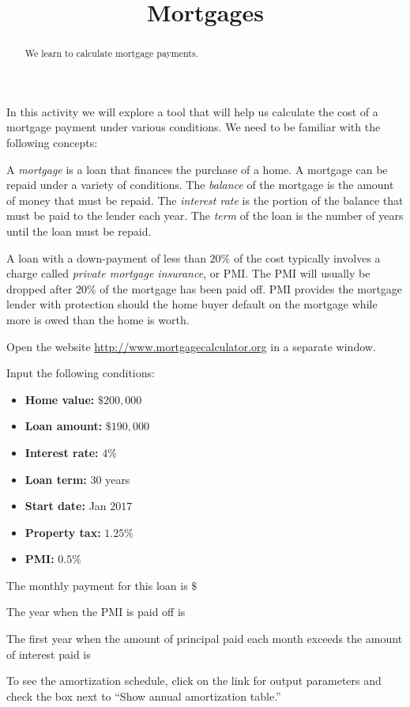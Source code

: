 \documentclass{ximera}
\title{Mortgages}
\begin{document}
\begin{abstract}
We learn to calculate mortgage payments.
\end{abstract}
\maketitle

In this activity we will explore a tool that will help us calculate the cost of a mortgage payment under various conditions. We need to be familiar with the following concepts:  

A \emph{mortgage} is a loan that finances the purchase of a home. A mortgage can be repaid under a variety of conditions. The \emph{balance} of the mortgage is the amount of money that must be repaid. The \emph{interest rate} is the portion of the balance that must be paid to the lender each year. The \emph{term} of the loan is the number of years until the loan must be repaid.

A loan with a down-payment of less than $20\%$ of the cost typically involves a charge called \emph{private mortgage insurance}, or PMI. The PMI will usually be dropped after $20\%$ of the mortgage has been paid off. PMI provides the mortgage lender with protection should the home buyer default on the mortgage while more is owed than the home is worth.

Open the website \href{http://www.mortgagecalculator.org}{http://www.mortgagecalculator.org} in a separate window. 

\begin{question}
Input the following conditions:
\begin{itemize}
\item\textbf{Home value:} $\$200,000$
\item\textbf{Loan amount:} $\$190,000$
\item\textbf{Interest rate:} $4$\%
\item\textbf{Loan term:} $30$ years
\item\textbf{Start date:} Jan $2017$
\item\textbf{Property tax:} $1.25\%$
\item\textbf{PMI:} $0.5\%$
\end{itemize}

The monthly payment for this loan is $\$$

The year when the PMI is paid off is 

The first year when the amount of principal paid each month exceeds the amount of interest paid is 

\begin{hint}
To see the amortization schedule, click on the link for output parameters and check the box next to ``Show annual amortization table.''
\end{hint}
\end{question}
\end{document}
